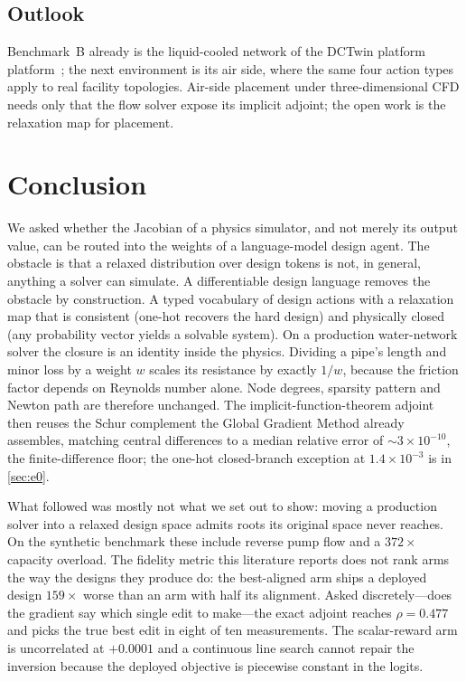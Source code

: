 \documentclass[journal]{IEEEtran}
\newif\ifblindreview
\newcommand{\platform}{\ifblindreview a production data-centre digital-twin platform\else the DCTwin platform\fi}
\begin{document}
\subsection{Outlook}
Benchmark~B already is the liquid-cooled network of \platform
platform~\cite{li2026dctwin}; the next environment is its air side, where the
same four action types apply to real facility topologies.  Air-side placement
under three-dimensional CFD needs only that the flow solver expose its implicit
adjoint; the open work is the relaxation map for placement.

\FloatBarrier
\section{Conclusion}
\label{sec:conclusion}

We asked whether the Jacobian of a physics simulator, and not merely its output
value, can be routed into the weights of a language-model design agent.  The
obstacle is that a relaxed distribution over design tokens is not, in general,
anything a solver can simulate.  A differentiable design language removes the
obstacle by construction. A typed vocabulary of design actions with a relaxation
map that is consistent (one-hot recovers the hard design) and physically closed
(any probability vector yields a solvable system).  On a production
water-network solver the closure is an identity inside the physics.  Dividing a
pipe's length and minor loss by a weight $w$ scales its resistance by exactly
$1/w$, because the friction factor depends on Reynolds number alone.  Node
degrees, sparsity pattern and Newton path are therefore unchanged.  The
implicit-function-theorem adjoint then reuses the Schur complement the Global
Gradient Method already assembles, matching central differences to a median
relative error of $\sim3\times10^{-10}$, the finite-difference floor; the one-hot
closed-branch exception at $1.4\times10^{-3}$ is in \cref{sec:e0}.

What followed was mostly not what we set out to show: moving a production solver
into a relaxed design space admits roots its original space never reaches.  On
the synthetic benchmark these include reverse pump flow and a $372\times$
capacity overload.  The fidelity
metric this literature reports does not rank arms the way the designs they
produce do: the best-aligned arm ships a deployed design $159\times$ worse than
an arm with half its alignment.  Asked discretely---does the gradient say
which single edit to make---the exact adjoint reaches $\rho=0.477$ and picks the
true best edit in eight of ten measurements. The scalar-reward arm is
uncorrelated at $+0.0001$ and a continuous line search cannot repair the
inversion because the deployed objective is piecewise constant in the logits.
\end{document}
